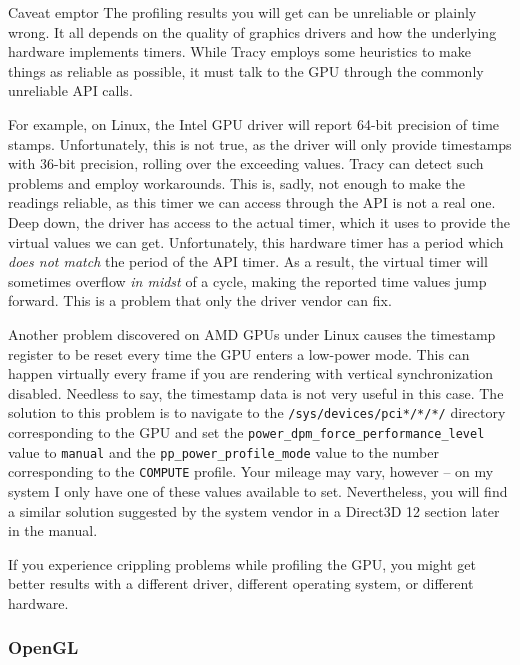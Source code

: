 \documentclass[hidelinks,titlepage,a4paper]{article}
\begin{document}
\begin{bclogo}[
noborder=true,
couleur=black!5,
logo=\bcattention
]{Caveat emptor}
The profiling results you will get can be unreliable or plainly wrong. It all depends on the quality of graphics drivers and how the underlying hardware implements timers. While Tracy employs some heuristics to make things as reliable as possible, it must talk to the GPU through the commonly unreliable API calls.

For example, on Linux, the Intel GPU driver will report 64-bit precision of time stamps. Unfortunately, this is not true, as the driver will only provide timestamps with 36-bit precision, rolling over the exceeding values. Tracy can detect such problems and employ workarounds. This is, sadly, not enough to make the readings reliable, as this timer we can access through the API is not a real one. Deep down, the driver has access to the actual timer, which it uses to provide the virtual values we can get. Unfortunately, this hardware timer has a period which \emph{does not match} the period of the API timer. As a result, the virtual timer will sometimes overflow \emph{in midst} of a cycle, making the reported time values jump forward. This is a problem that only the driver vendor can fix.

Another problem discovered on AMD GPUs under Linux causes the timestamp register to be reset every time the GPU enters a low-power mode. This can happen virtually every frame if you are rendering with vertical synchronization disabled. Needless to say, the timestamp data is not very useful in this case. The solution to this problem is to navigate to the \texttt{/sys/devices/pci*/*/*/} directory corresponding to the GPU and set the \texttt{power\_dpm\_force\_performance\_level} value to \texttt{manual} and the \texttt{pp\_power\_profile\_mode} value to the number corresponding to the \texttt{COMPUTE} profile. Your mileage may vary, however -- on my system I only have one of these values available to set. Nevertheless, you will find a similar solution suggested by the system vendor in a Direct3D 12 section later in the manual.

If you experience crippling problems while profiling the GPU, you might get better results with a different driver, different operating system, or different hardware.
\end{bclogo}

\subsubsection{OpenGL}
\end{document}
